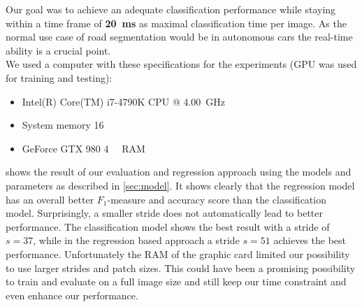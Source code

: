 Our goal was to achieve an adequate classification performance while staying
within a time frame of \textbf{\SI{20}{\milli\second}} as maximal
classification time per image. As the normal use case of road segmentation
would be in autonomous cars the real-time ability is a crucial point.\\

We used a computer with these specifications for the experiments (GPU was used
for training and testing):
\begin{itemize}
    \item Intel(R) Core(TM) i7-4790K CPU @ \SI{4.00}{\giga\hertz}
    \item System memory \SI{16}{\gibi\byte}
    \item GeForce GTX 980 \SI{4}{\gibi\byte} RAM
\end{itemize}

 shows the result of our evaluation and regression
approach using the models and parameters as described in \cref{sec:model}. It
shows clearly that the regression model has an overall better $F_1$-measure and
accuracy score than the classification model. Surprisingly, a smaller stride
does not automatically lead to better performance. The classification model
shows  the best result with a stride of $s=37$, while in the regression based
approach a stride $s=51$ achieves the best performance. Unfortunately the RAM
of the graphic card limited our possibility to use larger strides and patch
sizes. This could have been a promising possibility to train and evaluate on a
full image size and still keep our time constraint and even enhance our
performance.\\

